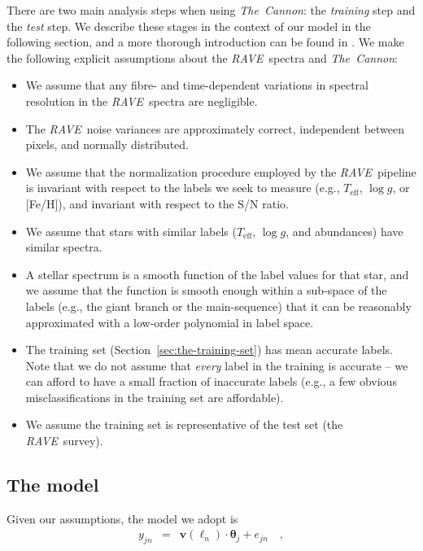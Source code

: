\documentclass[preprint,trackchanges]{aastex}
\newcommand{\acronym}[1]{{\small{#1}}}
\newcommand{\project}[1]{\textsl{#1}}
\newcommand{\thecannon}{\project{The~Cannon}}
\newcommand{\rave}{\project{\acronym{RAVE}}}
\newcommand{\teff}{T_{\mathrm{eff}}}
\newcommand{\logg}{\log g}
\newcommand{\Dvector}[1]{\boldsymbol{#1}}
\newcommand{\vectheta}{\Dvector{\theta}}
\newcommand{\vecv}{\Dvector{v}}
\begin{document}
There are two main analysis steps when using \thecannon: the \emph{training} 
step and the \emph{test} step.  We describe these stages in the context of our
model in the following section, and a more thorough introduction can be found
in \citet{Ness_2015}.  We make the following explicit assumptions about the 
\rave\ spectra and \thecannon:

\begin{itemize}
\item We assume that any fibre- and time-dependent variations in spectral
resolution in the \rave\ spectra are negligible.
\item The \rave\ noise variances are approximately correct, independent between
pixels, and normally distributed.
\item We assume that the normalization procedure employed by the \rave\ pipeline
is invariant with respect to the labels we seek to measure (e.g., $\teff$, $\logg$,
or [Fe/H]), and invariant with respect to the S/N ratio.
\item We assume that stars with similar labels ($\teff$, $\logg$, and abundances)
have similar spectra.
\item A stellar spectrum is a smooth function of the label values for that star,
and we assume that the function is smooth enough within a sub-space of the labels
(e.g., the giant branch or the main-sequence) that it can be reasonably approximated 
with a low-order polynomial in label space.
\item The training set (Section~\ref{sec:the-training-set}) has mean accurate labels.
Note that we do not assume that \emph{every} label in the training is accurate -- we
can afford to have a small fraction of inaccurate labels (e.g., a few obvious 
misclassifications in the training set are affordable).
\item We assume the training set is representative of the test set (the \rave\ survey).
\end{itemize}


\subsection{The model}
\label{sec:the-model}


\noindent{}Given our assumptions, the model we adopt is
\begin{eqnarray}\label{eq:model}
y_{jn} & = & \vecv(\ell_n)\cdot\vectheta_j + e_{jn}\quad ,
\end{eqnarray}
\end{document}
